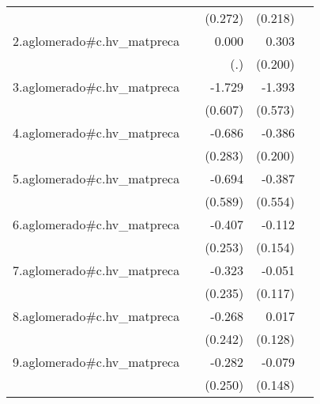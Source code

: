{\begin{longtable}{l*{4}{D{.}{.}{-1}}}
            &                     &     (0.272)         &     (0.218)         &                     \\
\addlinespace
2.aglomerado#c.hv\_matpreca&                     &       0.000         &       0.303         &                     \\
            &                     &         (.)         &     (0.200)         &                     \\
\addlinespace
3.aglomerado#c.hv\_matpreca&                     &      -1.729\sym{**} &      -1.393\sym{*}  &                     \\
            &                     &     (0.607)         &     (0.573)         &                     \\
\addlinespace
4.aglomerado#c.hv\_matpreca&                     &      -0.686\sym{*}  &      -0.386         &                     \\
            &                     &     (0.283)         &     (0.200)         &                     \\
\addlinespace
5.aglomerado#c.hv\_matpreca&                     &      -0.694         &      -0.387         &                     \\
            &                     &     (0.589)         &     (0.554)         &                     \\
\addlinespace
6.aglomerado#c.hv\_matpreca&                     &      -0.407         &      -0.112         &                     \\
            &                     &     (0.253)         &     (0.154)         &                     \\
\addlinespace
7.aglomerado#c.hv\_matpreca&                     &      -0.323         &      -0.051         &                     \\
            &                     &     (0.235)         &     (0.117)         &                     \\
\addlinespace
8.aglomerado#c.hv\_matpreca&                     &      -0.268         &       0.017         &                     \\
            &                     &     (0.242)         &     (0.128)         &                     \\
\addlinespace
9.aglomerado#c.hv\_matpreca&                     &      -0.282         &      -0.079         &                     \\
            &                     &     (0.250)         &     (0.148)         &                     \\

\end{longtable}}
